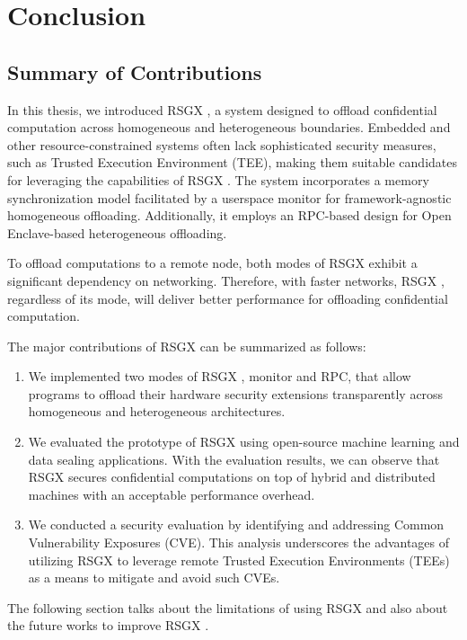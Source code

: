 \documentclass[article, doublespace,nopageskip]{VTthesis} %
\newcommand{\monitor}{RSGX \xspace}
\begin{document}
    \chapter{Conclusion} \label{ch:conclusion}
    \section{Summary of Contributions}
    In this thesis, we introduced \monitor, a system designed to offload confidential computation across homogeneous and heterogeneous boundaries. Embedded and other resource-constrained systems often lack sophisticated security measures, such as Trusted Execution Environment (TEE), making them suitable candidates for leveraging the capabilities of \monitor. The system incorporates a memory synchronization model facilitated by a userspace monitor for framework-agnostic homogeneous offloading. Additionally, it employs an RPC-based design for Open Enclave-based heterogeneous offloading.
    
    To offload computations to a remote node, both modes of \monitor exhibit a significant dependency on networking. Therefore, with faster networks, \monitor, regardless of its mode, will deliver better performance for offloading confidential computation.
    
    The major contributions of \monitor can be summarized as follows:
    \begin{enumerate}
        \item We implemented two modes of \monitor, monitor and RPC, that allow programs to offload their hardware security extensions transparently across homogeneous and heterogeneous architectures. 
        \item We evaluated the prototype of \monitor using open-source machine learning and data sealing applications. With the evaluation results, we can observe that \monitor secures confidential computations on top of hybrid and distributed machines with an acceptable performance overhead.
        \item We conducted a security evaluation by identifying and addressing Common Vulnerability Exposures (CVE). This analysis underscores the advantages of utilizing \monitor to leverage remote Trusted Execution Environments (TEEs) as a means to mitigate and avoid such CVEs.
    \end{enumerate}

    The following section talks about the limitations of using \monitor and also about the future works to improve \monitor.
\end{document}
